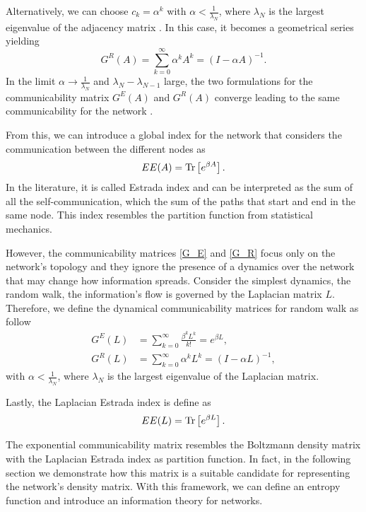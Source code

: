 Alternatively, we can choose $c_k = \alpha^{k}$ with $\alpha<\frac{1}{\lambda_N}$, where $\lambda_N$ is the largest eigenvalue of the adjacency matrix \cite{Katz}. In this case, it becomes a geometrical series yielding
\begin{equation}\label{G_R}
    G^R(A) =\sum_{k=0}^{\infty} \alpha^k A^k = (I -\alpha A)^{-1}.
\end{equation}
In the limit $\alpha \rightarrow \frac{1}{\lambda_N}$ and $\lambda_N -\lambda_{N-1}$ large, the two formulations for the communicability matrix $G^E(A)$ and $G^R(A)$ converge leading to the same communicability for the network \cite{Benzi_Klymko}.

From this, we can introduce a global index for the network that considers the communication between the different nodes as
\begin{equation}
    EE(A)  = \operatorname{Tr}\left[e^{\beta A}\right].
\end{equation}
In the literature, it is called Estrada index \cite{Estrada_2008} and can be interpreted as the sum of all the self-communication, which the sum of the paths that start and end in the same node. This index resembles the partition function from statistical mechanics.

However, the communicability matrices \eqref{G_E} and \eqref{G_R} focus only on the network's topology and they ignore the presence of a dynamics over the network that may change how information spreads.
Consider the simplest dynamics, the random walk, the information's flow is governed by the Laplacian matrix $L$. 
Therefore, we define the dynamical communicability matrices for random walk as follow \cite{Estrada_2012}
\begin{equation}\label{Estrada indeces}
    \begin{split}
        G^E(L) &=\sum_{k=0}^{\infty} \frac{\beta^k L^k}{k!} = e^{\beta L},  \\ 
        G^R(L) &= \sum_{k=0}^{\infty} \alpha^k L^k = (I -\alpha L)^{-1},
    \end{split}
\end{equation}
with $\alpha<\frac{1}{\lambda_N}$, where $\lambda_N$ is the largest eigenvalue of the Laplacian matrix.

Lastly, the Laplacian Estrada index is define as
\begin{equation}\label{EE_L}
    EE(L) = \operatorname{Tr}\left[e^{\beta L}\right].
\end{equation}

The exponential communicability matrix resembles the Boltzmann density matrix with the Laplacian Estrada index as partition function. In fact, in the following section we demonstrate how this matrix is a suitable candidate for representing the network's density matrix. With this framework, we can define an entropy function and introduce an information theory for networks. 

